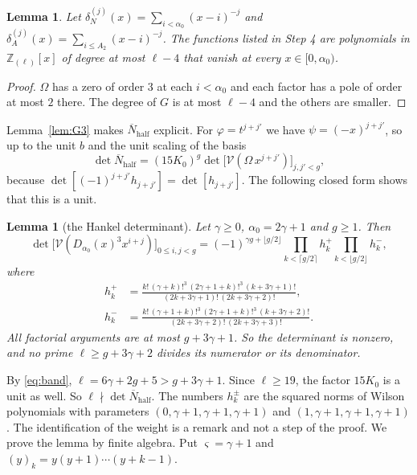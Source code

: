 \documentclass[11pt]{amsart}
\newtheorem{lemma}[theorem]{Lemma}
\theoremstyle{definition}
\theoremstyle{remark}
\numberwithin{equation}{section}
\newcommand{\Z}{\mathbb Z}
\begin{document}
\begin{lemma}\label{lem:Wt}
Let $\delta_N^{(j)}(x)=\sum_{i<\alpha_0}(x-i)^{-j}$ and $\delta_A^{(j)}(x)=\sum_{i\le A_2}(x-i)^{-j}$. The functions listed in Step 4 are polynomials in $\Z_{(\ell)}[x]$ of degree at most
$\ell-4$ that vanish at every $x\in[0,\alpha_0)$.
\end{lemma}

\begin{proof}
$\Omega$ has a zero of order $3$ at each $i<\alpha_0$ and each factor has a pole of order at most $2$ there. The degree of $G$ is at most $\ell-4$ and the others are smaller.
\end{proof}

Lemma~\ref{lem:G3} makes $\overline N_{\mathrm{half}}$ explicit. For $\varphi=t^{j+j'}$ we have $\psi=(-x)^{j+j'}$, so up to the unit $b$ and the unit scaling of the basis
\[
 \det\overline N_{\mathrm{half}}=(15K_0)^g\det\bigl[\mathcal V(\Omega\,x^{j+j'})\bigr]_{j,j'<g},
\]
because $\det[(-1)^{j+j'}h_{j+j'}]=\det[h_{j+j'}]$. The following closed form shows that this is a unit.

\begin{lemma}[the Hankel determinant]\label{lem:W}
Let $\gamma\ge0$, $\alpha_0=2\gamma+1$ and $g\ge1$. Then
\[
 \det\bigl[\mathcal V(D_{\alpha_0}(x)^3x^{i+j})\bigr]_{0\le i,j<g}=(-1)^{\gamma g+\lfloor g/2\rfloor}\prod_{k<\lceil g/2\rceil}h^+_k\prod_{k<\lfloor g/2\rfloor}h^-_k,
\]
where
\begin{align*}
 h^+_k&=\frac{k!\,(\gamma+k)!^3\,(2\gamma+1+k)!^3\,(k+3\gamma+1)!}{(2k+3\gamma+1)!\,(2k+3\gamma+2)!},\\
 h^-_k&=\frac{k!\,(\gamma+1+k)!^3\,(2\gamma+1+k)!^3\,(k+3\gamma+2)!}{(2k+3\gamma+2)!\,(2k+3\gamma+3)!}.
\end{align*}
All factorial arguments are at most $g+3\gamma+1$. So the determinant is nonzero, and no prime $\ell\ge g+3\gamma+2$ divides its numerator or its denominator.
\end{lemma}

By \eqref{eq:band}, $\ell=6\gamma+2g+5>g+3\gamma+1$. Since $\ell\ge19$, the factor $15K_0$ is a unit as well. So
$\ell\nmid\det\overline N_{\mathrm{half}}$. The numbers $h^\pm_k$ are the squared norms of Wilson polynomials with
parameters $(0,\gamma+1,\gamma+1,\gamma+1)$ and $(1,\gamma+1,\gamma+1,\gamma+1)$ \cite{Wilson80,KLS}. The
identification of the weight is a remark and not a step of the proof. We prove the lemma by finite algebra. Put $\varsigma=\gamma+1$ and $(y)_k=y(y+1)\cdots(y+k-1)$.
\end{document}
